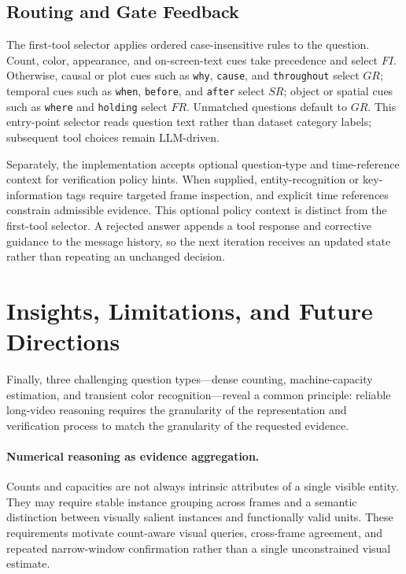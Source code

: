 \subsection{Routing and Gate Feedback}
\label{sec:routing-details}

The first-tool selector applies ordered case-insensitive rules to the question.
Count, color, appearance, and on-screen-text cues take precedence and select $FI$.
Otherwise, causal or plot cues such as \texttt{why}, \texttt{cause}, and \texttt{throughout} select $GR$; temporal cues such as \texttt{when}, \texttt{before}, and \texttt{after} select $SR$; object or spatial cues such as \texttt{where} and \texttt{holding} select $FR$.
Unmatched questions default to $GR$.
This entry-point selector reads question text rather than dataset category labels; subsequent tool choices remain LLM-driven.

Separately, the implementation accepts optional question-type and time-reference context for verification policy hints.
When supplied, entity-recognition or key-information tags require targeted frame inspection, and explicit time references constrain admissible evidence.
This optional policy context is distinct from the first-tool selector.
A rejected answer appends a tool response and corrective guidance to the message history, so the next iteration receives an updated state rather than repeating an unchanged decision.

\section{Insights, Limitations, and Future Directions}
\label{sec:supp-limitations}

Finally, three challenging question types---dense counting, machine-capacity estimation, and transient color recognition---reveal a common principle: reliable long-video reasoning requires the granularity of the representation and verification process to match the granularity of the requested evidence.

\paragraph{Numerical reasoning as evidence aggregation.}
Counts and capacities are not always intrinsic attributes of a single visible entity.
They may require stable instance grouping across frames and a semantic distinction between visually salient instances and functionally valid units.
These requirements motivate count-aware visual queries, cross-frame agreement, and repeated narrow-window confirmation rather than a single unconstrained visual estimate.

